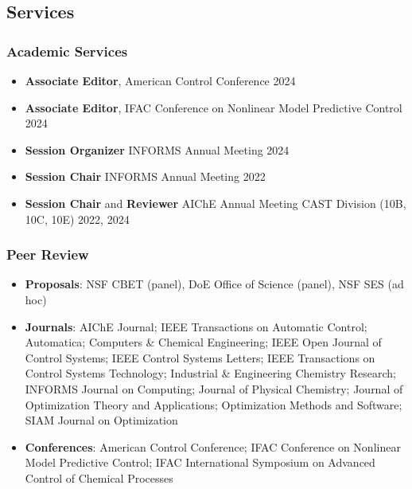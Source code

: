 \subsection*{Services}
\subsubsection*{Academic Services}
\begin{itemize}[leftmargin=*,itemsep=-1pt]
  \item[] \textbf{Associate Editor}, American Control Conference \hfill 2024
  \item[] \textbf{Associate Editor}, IFAC Conference on Nonlinear Model Predictive Control \hfill 2024
\item[] \textbf{Session Organizer} INFORMS Annual Meeting \hfill 2024
\item[] \textbf{Session Chair} INFORMS Annual Meeting \hfill 2022
\item[] \textbf{Session Chair} and \textbf{Reviewer} AIChE Annual Meeting CAST Division (10B, 10C, 10E) \hfill 2022, 2024
\end{itemize}

\subsubsection*{Peer Review}
\begin{itemize}[itemsep=1pt, parsep=0pt,leftmargin=*]
\item[] \textbf{Proposals}: NSF CBET (panel), DoE Office of Science (panel), NSF SES (ad hoc)
\item[] \textbf{Journals}: AIChE Journal; IEEE Transactions on Automatic Control; Automatica; Computers \& Chemical Engineering; IEEE Open Journal of Control Systems; IEEE Control Systems Letters; IEEE Transactions on Control Systems Technology; Industrial \& Engineering Chemistry Research; INFORMS Journal on Computing; Journal of Physical Chemistry; Journal of Optimization Theory and Applications; Optimization Methods and Software; SIAM Journal on Optimization
\item[] \textbf{Conferences}: American Control Conference; IFAC Conference on Nonlinear Model Predictive Control; IFAC International Symposium on Advanced Control of Chemical Processes 
\end{itemize}  

